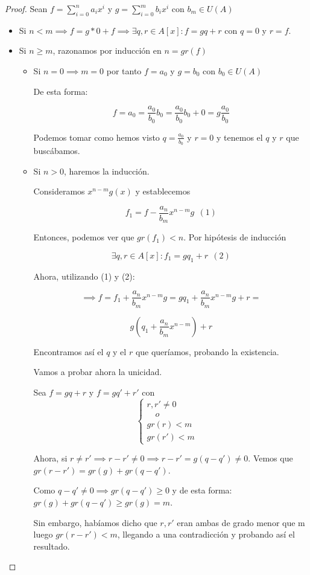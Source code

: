 \begin{proof}

	Sean $f = \sum_{i=0}^n a_i x^i$ y $g = \sum_{i=0}^m b_i x^i$ con $b_m \in U(A)$

	\begin{itemize}

	\item Si $n< m \implies f = g * 0 + f \implies \exists q,r\in A[x] : f = gq+r$ con $q=0$ y $r = f$.

	\item Si $n\geq m$, razonamos por inducción en $n=gr(f)$
	\begin{itemize}

	\item Si $n=0 \implies m = 0$ por tanto $f=a_0$ y $g=b_0$ con $b_0 \in U(A)$

	De esta forma:

	\[
	f = a_0 = \frac{a_0}{b_0}b_0 = \frac{a_0}{b_0}b_0 + 0 = g\frac{a_0}{b_0}
	\]

	Podemos tomar como hemos visto $q=\frac{a_0}{b_0}$ y $r=0$ y tenemos el $q$ y $r$ que buscábamos.

	\item Si $n> 0$, haremos la inducción.

	  Consideramos $x^{n-m}g(x)$ y establecemos

          $$f_1 = f - \frac{a_n}{b_m}x^{n-m}g\ \ (1)$$

	  Entonces, podemos ver que $gr(f_1) < n$. Por hipótesis de inducción

          $$ \exists q,r \in A[x] : f_1 = gq_1 + r \ \ (2)$$

	Ahora, utilizando (1) y (2):

	 \[
	 \implies f = f_1 +\frac{a_n}{b_m}x^{n-m}g = gq_1 + \frac{a_n}{b_m}x^{n-m}g +r =
	 \]

	 \[
	 g\left(q_1 + \frac{a_n}{b_m}x^{n-m}\right) + r
	 \]

	Encontramos así el $q$ y el $r$ que queríamos, probando la existencia.

	Vamos a probar ahora la unicidad.

	Sea $f=gq+r$ y $f= gq' +r'$ con
	\[
    \begin{cases}
		 r,r' \neq 0\\
		  \quad o \\
 gr(r) < m
 \\ gr(r') < m

\end{cases}
	\quad
	\]

	Ahora, si $r\neq r'\implies r-r' \neq 0 \implies r-r' = g(q-q') \neq 0$.
	Vemos que $gr(r-r') = gr(g)+ gr(q-q')$.

 Como $q-q' \neq 0 \implies gr(q-q') \geq 0 $ y de esta forma: $gr(g)+ gr(q-q') \geq gr(g) = m$.

 Sin embargo, habíamos dicho que $r,r'$ eran ambas de grado menor que m luego $gr(r-r') < m$, llegando a una contradicción y probando así el resultado.
\end{itemize}


\end{itemize}
\end{proof}

